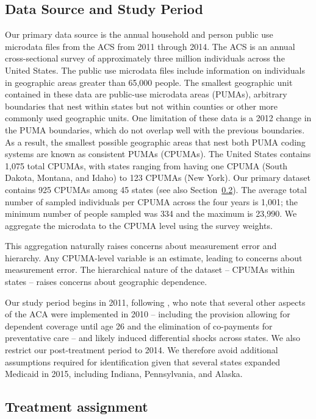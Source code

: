 \documentclass[aoas]{imsart}
\theoremstyle{plain}
\theoremstyle{remark}
\begin{document}
\subsection{Data Source and Study Period}\label{ssec:data}

Our primary data source is the annual household and person public use microdata files from the ACS from 2011 through 2014. The ACS is an annual cross-sectional survey of approximately three million individuals across the United States. The public use microdata files include information on individuals in geographic areas greater than 65,000 people. The smallest geographic unit contained in these data are public-use microdata areas (PUMAs), arbitrary boundaries that nest within states but not within counties or other more commonly used geographic units. One limitation of these data is a 2012 change in the PUMA boundaries, which do not overlap well with the previous boundaries. As a result, the smallest possible geographic areas that nest both PUMA coding systems are known as consistent PUMAs (CPUMAs). The United States contains 1,075 total CPUMAs, with states ranging from having one CPUMA (South Dakota, Montana, and Idaho) to 123 CPUMAs (New York). Our primary dataset contains 925 CPUMAs among 45 states (see also Section~\ref{sssec:txassign}). The average total number of sampled individuals per CPUMA across the four years is 1,001; the minimum number of people sampled was 334 and the maximum is 23,990. We aggregate the microdata to the CPUMA level using the survey weights.  

This aggregation naturally raises concerns about measurement error and hierarchy. Any CPUMA-level variable is an estimate, leading to concerns about measurement error. The hierarchical nature of the dataset -- CPUMAs within states -- raises concerns about geographic dependence.

Our study period begins in 2011, following \citet{courtemanche2017early}, who note that several other aspects of the ACA were implemented in 2010 -- including the provision allowing for dependent coverage until age 26 and the elimination of co-payments for preventative care -- and likely induced differential shocks across states. We also restrict our post-treatment period to 2014. We therefore avoid additional assumptions required for identification given that several states expanded Medicaid in 2015, including Indiana, Pennsylvania, and Alaska.

\subsection{Treatment assignment} \label{sssec:txassign}
\end{document}
